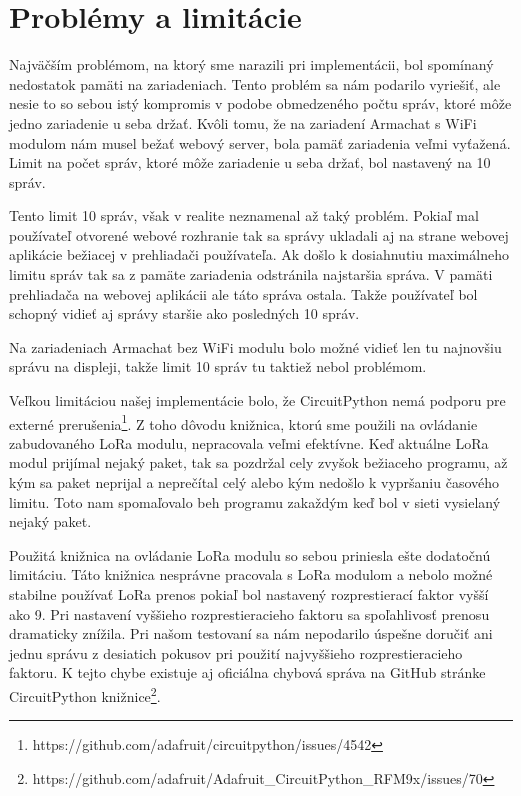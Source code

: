 \documentclass[slovak,master]{diploma}
\begin{document}
\section{Problémy a limitácie}
Najväčším problémom, na ktorý sme narazili pri implementácii, bol spomínaný nedostatok pamäti na zariadeniach. Tento problém sa nám podarilo 
vyriešiť, ale nesie to so sebou istý kompromis v podobe obmedzeného počtu správ, ktoré môže jedno zariadenie u seba držať. Kvôli tomu, že na 
zariadení Armachat s WiFi modulom nám musel bežať webový server, bola pamäť zariadenia veľmi vyťažená. Limit na počet správ, ktoré môže zariadenie u seba držať, bol nastavený 
na 10 správ. 

Tento limit 10 správ, však v realite neznamenal až taký problém. Pokiaľ mal používateľ otvorené webové rozhranie tak sa správy ukladali aj na strane webovej aplikácie 
bežiacej v prehliadači používateľa. Ak došlo k dosiahnutiu maximálneho limitu správ tak sa z pamäte zariadenia odstránila najstaršia správa. V pamäti prehliadača na webovej aplikácii 
ale táto správa ostala. Takže používateľ bol schopný vidieť aj správy staršie ako posledných 10 správ.

Na zariadeniach Armachat bez WiFi modulu bolo možné vidieť len tu najnovšiu správu na displeji, takže limit 10 správ tu taktiež nebol problémom.

Veľkou limitáciou našej implementácie bolo, že CircuitPython nemá podporu pre externé prerušenia\footnote[1]{https://github.com/adafruit/circuitpython/issues/4542}. Z toho dôvodu knižnica, ktorú sme použili na ovládanie zabudovaného LoRa modulu, 
nepracovala veľmi efektívne. Keď aktuálne LoRa modul prijímal nejaký paket, tak sa pozdržal cely zvyšok bežiaceho programu, až kým sa paket neprijal a neprečítal celý alebo kým nedošlo k vypršaniu 
časového limitu. Toto nam spomaľovalo beh programu zakaždým keď bol v sieti vysielaný nejaký paket.

Použitá knižnica na ovládanie LoRa modulu so sebou priniesla ešte dodatočnú limitáciu. Táto knižnica nesprávne pracovala s LoRa modulom a nebolo možné stabilne používať 
LoRa prenos pokiaľ bol nastavený rozprestierací faktor vyšší ako 9. Pri nastavení vyššieho rozprestieracieho faktoru sa spoľahlivosť prenosu dramaticky znížila. Pri 
našom testovaní sa nám nepodarilo úspešne doručiť ani jednu správu z desiatich pokusov pri použití najvyššieho rozprestieracieho faktoru. 
K tejto chybe existuje aj oficiálna chybová správa na GitHub stránke CircuitPython knižnice\footnote[2]{https://github.com/adafruit/Adafruit\_CircuitPython\_RFM9x/issues/70}.
\end{document}

